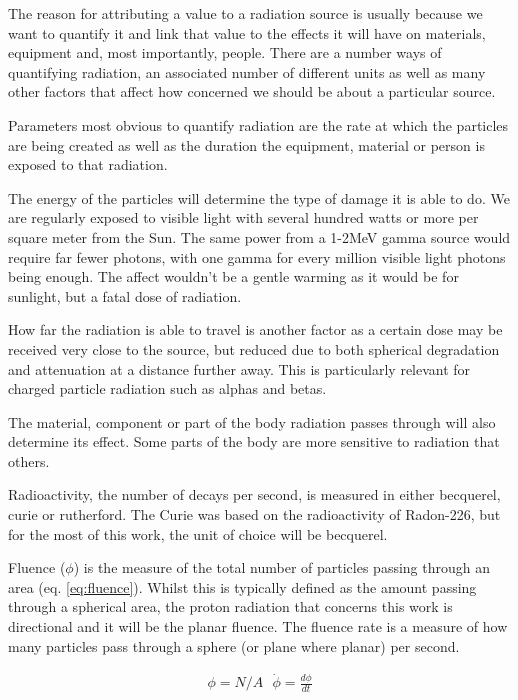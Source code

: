 The reason for attributing a value to a radiation source is usually because we want to quantify it and link that value to the effects it will have on materials, equipment and, most importantly, people.  There are a number ways of quantifying radiation, an associated number of different units as well as many other factors that affect how concerned we should be about a particular source.

Parameters most obvious to quantify radiation are the rate at which the particles are being created as well as the duration the equipment, material or person is exposed to that radiation. 

The energy of the particles will determine the type of damage it is able to do.  We are regularly exposed to visible light with several hundred watts or more per square meter from the Sun.  The same power from a 1-2MeV gamma source would require far fewer photons, with one gamma for every million visible light photons being enough.  The affect wouldn't be a gentle warming as it would be for sunlight, but a fatal dose of radiation.

How far the radiation is able to travel is another factor as a certain dose may be received very close to the source, but reduced due to both spherical degradation and attenuation at a distance further away.  This is particularly relevant for charged particle radiation such as alphas and betas.

The material, component or part of the body radiation passes through will also determine its effect.  Some parts of the body are more sensitive to radiation that others.




Radioactivity, the number of decays per second, is measured in either \Gls{becquerel}, \Gls{curie} or \gls{rutherford}.  The Curie was based on the radioactivity of Radon-226, but for the most of this work, the unit of choice will be \gls{becquerel}.

Fluence ($\phi$) is the measure of the total number of particles passing through an area (eq. \ref{eq:fluence}).  Whilst this is typically defined as the amount passing through a spherical area, the proton radiation that concerns this work is directional and it will be the planar fluence\cite{dosimetrygreening}.  The fluence rate is a measure of how many particles pass through a sphere (or plane where planar) per second.

\begin{equation}
\begin{split}
\phi = N/A \text{    } \dot{\phi} = \frac{d\phi}{dt} 
\label{eq:fluence}
\end{split}
\end{equation}

